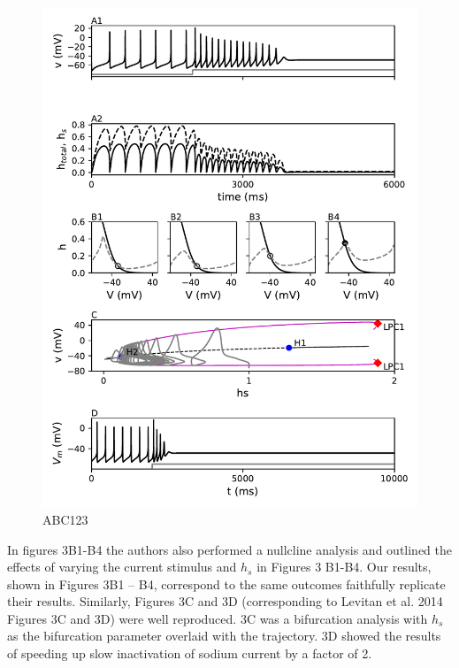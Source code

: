 \begin{figure}
	\centering
	\includegraphics[scale=0.7]{../figures/figure_3.pdf}
	\caption{ABC123}
	\label{fig:3}
\end{figure}

In figures 3B1-B4 the authors also performed a nullcline analysis and outlined the effects of varying the current stimulus and $h_s$ in Figures 3 B1-B4. Our results, shown in Figures 3B1 – B4, correspond to the same outcomes faithfully replicate their results. Similarly, Figures 3C and 3D (corresponding to Levitan et al. 2014 Figures 3C and 3D) were well reproduced. 3C was a bifurcation analysis with $h_s$ as the bifurcation parameter overlaid with the trajectory. 3D showed the results of speeding up slow inactivation of sodium current by a factor of 2.\\ 


